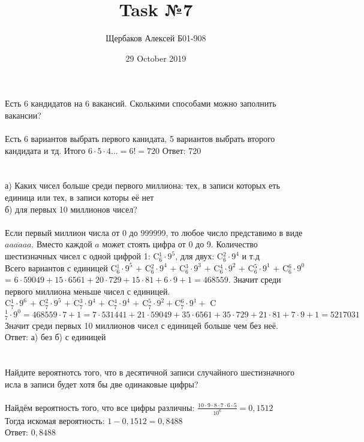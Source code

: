 \documentclass{article}
\title{Task №7}
\author{Щербаков Алексей Б01-908}
\date{29 October 2019}
\begin{document}
\maketitle
\section{}
Есть 6 кандидатов на 6 вакансий. Сколькими способами можно заполнить вакансии?\\\\
Есть 6 вариантов выбрать первого канидата, 5 вариантов выбрать второго кандидата и тд. Итого $6\cdot 5\cdot 4... = 6! = 720$
Ответ: 720
\section{}
а) Каких чисел больше среди первого миллиона: тех, в записи которых еть единица или тех, в записи которы её нет\\
б) для первых 10 миллионов чисел?\\\\
Если первый миллион числа от 0 до 999999, то любое число представимо в виде $\overline{aaaaaa}$. Вместо каждой $a$ может стоять цифра от 0 до 9.
Количество шестизначных чисел с одной цифрой 1: C$^1_6 \cdot 9^5$, 
для двух: C$^2_6 \cdot 9^4$ и т.д\\
Всего вариантов с единицей C$^1_6 \cdot 9^5$ $+$ C$^2_6 \cdot 9^4$ $+$ C$^3_6 \cdot 9^3$ $+$ C$^4_6 \cdot 9^2$ $+$ C$^5_6 \cdot 9^1$ $+$ C$^6_6 \cdot 9^0$ = $6 \cdot 59049 + 15 \cdot 6561 + 20 \cdot 729 + 15 \cdot 81 + 6\cdot 9 + 1 = 468559$. Значит среди первого миллиона меньше чисел с единицей.\\
C$^1_7 \cdot 9^6$ $+$ C$^2_7 \cdot 9^5$ $+$ C$^3_7 \cdot 9^4$ $+$ C$^4_7 \cdot 9^4$ $+$ C$^5_7 \cdot 9^2 + $C$^6_7 \cdot 9^1 +$ C$^1_7 \cdot 9^0 = 468559 \cdot 7 + 1 = 7 \cdot 531441 + 21 \cdot 59049 + 35 \cdot 6561 + 35 \cdot 729 + 21 \cdot 81 + 7 \cdot 9 + 1 = 5217031$\\
Значит среди первых 10 миллионов чисел с единицей больше чем без неё.\\
Ответ: а) без б) с единицей
\section{}
Найдите вероятнотсь того, что в десятичной записи случайного шестизначного исла в записи будет хотя бы две одинаковые цифры?\\\\
Найдём вероятность того, что все цифры различны: $\frac{10\cdot 9\cdot 8\cdot 7\cdot 6 \cdot 5}{10^6} = 0,1512$\\
Тогда искомая вероятность: $1 - 0,1512 = 0,8488$\\
Ответ: $0,8488$\\
\end{document}

